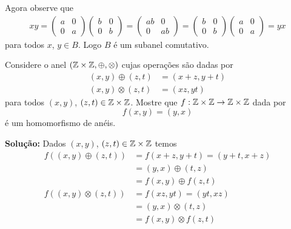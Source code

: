 \documentclass[12pt]{article}
\begin{document}
Agora observe que
\begin{align*}
	xy = \begin{pmatrix}
		a & 0\\0 & a
	\end{pmatrix}\begin{pmatrix}
		b & 0\\0 & b
	\end{pmatrix} = \begin{pmatrix}
		ab & 0\\0 & ab
	\end{pmatrix} = \begin{pmatrix}
		b & 0\\0 & b
	\end{pmatrix}\begin{pmatrix}
		a & 0\\0 & a
	\end{pmatrix} = yx
\end{align*}
para todos $x$, $y \in B$. Logo $B$ \'e um subanel comutativo.


\vspace{.5cm}

\questao Considere o anel $(\mathbb{Z} \times \mathbb{Z}, \oplus, \otimes)$ cujas opera\c{c}\~oes s\~ao dadas por
\begin{align*}
	(x, y) \oplus (z, t) &= (x + z, y + t)\\
	(x, y) \otimes (z, t) &= (xz, yt)
\end{align*}
para todos $(x, y)$, $(z, t) \in \mathbb{Z} \times \mathbb{Z}$. Mostre que $f : \mathbb{Z} \times \mathbb{Z} \to \mathbb{Z} \times \mathbb{Z}$ dada por
\[
	f(x, y) = (y, x)
\]
\'e um homomorfismo de an\'eis.

\noindent\textbf{Solu\c{c}\~ao:} Dados $(x, y)$, $(z, t) \in \mathbb{Z} \times \mathbb{Z}$ temos
\begin{align*}
	f((x, y) \oplus (z, t)) &= f(x + z, y + t) = (y + t, x + z) \\ &= (y, x) \oplus (t, z) \\ &= f(x, y) \oplus f(z, t)\\
	f((x, y) \otimes (z, t)) &= f(xz, yt) = (yt, xz) \\ &= (y, x) \otimes (t, z) \\ &= f(x, y) \otimes f(z, t)\\
\end{align*}
\end{document}
